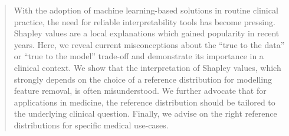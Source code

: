 \documentclass[nohyperref]{article}
\theoremstyle{plain}
\theoremstyle{definition}
\theoremstyle{remark}
\begin{document}
\printAffiliationsAndNotice{\icmlEqualContribution} %


\begin{abstract}
With the adoption of machine learning-based solutions in routine clinical practice, the need for reliable interpretability tools has become pressing. Shapley values are a local explanations which gained popularity in recent years. Here, we reveal current misconceptions about the ``true to the data'' or ``true to the model'' trade-off and demonstrate its importance in a clinical context. We show that the interpretation of Shapley values, which strongly depends on the choice of a reference distribution for modelling feature removal, is often misunderstood. We further advocate that for applications in medicine, the reference distribution should be tailored to the underlying clinical question. Finally, we advise on the right reference distributions for specific medical use-cases. 
\end{abstract}

\vspace*{-0.2cm}
\end{document}
